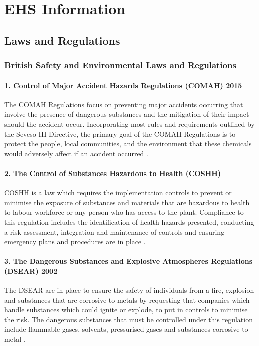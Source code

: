 \section{EHS Information}
\label{app:EHS}

\subsection{Laws and Regulations }

\subsubsection{British Safety and Environmental Laws and Regulations}
\paragraph{1. Control of Major Accident Hazards Regulations (COMAH) 2015} 

The COMAH Regulations focus on preventing major accidents occurring that involve the presence of dangerous substances and the mitigation of their impact should the accident occur. Incorporating most rules and requirements outlined by the Seveso III Directive, the primary goal of the COMAH Regulations is to protect the people, local communities, and the environment that these chemicals would adversely affect if an accident occurred \cite{govuk_control_nodate}. 

\paragraph{2. The Control of Substances Hazardous to Health (COSHH) }

COSHH is a law which requires the implementation controls to prevent or minimise the exposure of substances and materials that are hazardous to health to labour workforce or any person who has access to the plant. Compliance to this regulation includes the identification of health hazards presented, conducting a risk assessment, integration and maintenance of controls and ensuring emergency plans and procedures are in place \cite{govuk_what_nodate}.

\paragraph{3. The Dangerous Substances and Explosive Atmospheres Regulations (DSEAR) 2002}

The DSEAR are in place to ensure the safety of individuals from a fire, explosion and substances that are corrosive to metals by requesting that companies which handle substances which could ignite or explode, to put in controls to minimise the risk. The dangerous substances that must be controlled under this regulation include flammable gases, solvents, pressurised gases and substances corrosive to metal \cite{govuk_dangerous_nodate}. 

